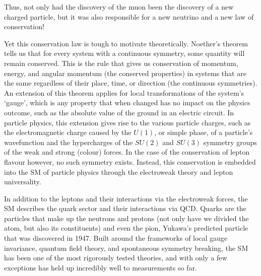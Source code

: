 Thus, not only had the discovery of the muon been the discovery of a new charged particle, but it was also responsible for a new neutrino and a new law of conservation!

Yet this conservation law is tough to motivate theoretically.
Noether's theorem tells us that for every system with a continuous symmetry, some quantity will remain conserved.
This is the rule that gives us conservation of momentum, energy, and angular momentum (the conserved properties) in systems that are the same regardless of their place, time, or direction (the continuous symmetries).
An extension of this theorem applies for local transformations of the system's `gauge', which is any property that when changed has no impact on the physics outcome, such as the absolute value of the ground in an electric circuit.
In particle physics, this extension gives rise to the various particle charges, such as the electromagnetic charge caused by the $U(1)$, or simple phase, of a particle's wavefunction and the hypercharges of the $SU(2)$ and $SU(3)$ symmetry groups of the weak and strong (colour) forces.
In the case of the conservation of lepton flavour however, no such symmetry exists.
Instead, this conservation is embedded into the \ac{SM} of particle physics through the electroweak theory and lepton universality.

In addition to the leptons and their interactions via the electroweak forces, the \ac{SM} describes the quark sector and their interactions via \ac{QCD}.
Quarks are the particles that make up the neutrons and protons (not only have we divided the atom, but also its constituents) and even the pion, Yukawa's predicted particle that was discovered in 1947.
Built around the frameworks of local gauge invariance, quantum field theory, and spontaneous symmetry breaking, the \ac{SM} has been one of the most rigorously tested theories, and with only a few exceptions has held up incredibly well to measurements so far.

